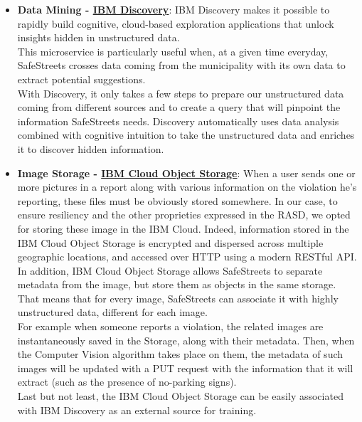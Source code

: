 \begin{itemize}
	\item \textbf{Data Mining - \href{https://cloud.ibm.com/catalog/services/discovery}{IBM Discovery}}: \hypertarget{discovery}{} IBM Discovery makes it possible to rapidly build cognitive, cloud-based exploration applications that unlock insights hidden in unstructured data. 
	\\This microservice is particularly useful when, at a given time everyday, SafeStreets crosses data coming from the municipality with its own data to extract potential suggestions.
	\\With Discovery, it only takes a few steps to prepare our unstructured data coming from different sources and to create a query that will pinpoint the information SafeStreets needs. Discovery automatically uses data analysis combined with cognitive intuition to take the unstructured data and enriches it to discover hidden information.
	
	\item \textbf{Image Storage - \href{https://cloud.ibm.com/catalog/services/cloud-object-storage}{IBM Cloud Object Storage}}: \hypertarget{cloudObjectStorage}{} When a user sends one or more pictures in a report along with various information on the violation he's reporting, these files must be obviously stored somewhere. In our case, to ensure  resiliency and the other proprieties expressed in the RASD, we opted for storing these image in the IBM Cloud. Indeed, information stored in the IBM Cloud Object Storage is encrypted and dispersed across multiple geographic locations, and accessed over HTTP using a modern RESTful API.
	In addition, IBM Cloud Object Storage allows SafeStreets to separate metadata from the image, but store them as objects in the same storage. That means that for every image, SafeStreets can associate it with highly unstructured data, different for each image. 
	\\For example when someone reports a violation, the related images are instantaneously saved in the Storage, along with their metadata. Then, when the Computer Vision algorithm takes place on them, the metadata of such images will be updated with a PUT request with the information that it will extract (such as the presence of no-parking signs).
	\\Last but not least, the IBM Cloud Object Storage can be easily associated with IBM Discovery as an external source for training.
	

\end{itemize}
